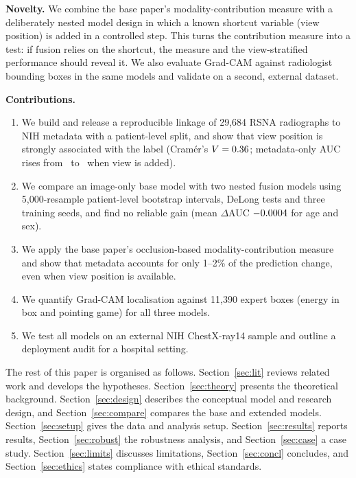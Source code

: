 \documentclass[conference]{IEEEtran}
\begin{document}
\textbf{Novelty.} We combine the base paper's modality-contribution measure with a deliberately nested model design in which a known shortcut variable (view position) is added in a controlled step. This turns the contribution measure into a test: if fusion relies on the shortcut, the measure and the view-stratified performance should reveal it. We also evaluate Grad-CAM against radiologist bounding boxes in the same models and validate on a second, external dataset.

\textbf{Contributions.}
\begin{enumerate}
\item We build and release a reproducible linkage of 29,684 RSNA radiographs to NIH metadata with a patient-level split, and show that view position is strongly associated with the label (Cram\'er's $V=0.36$; metadata-only AUC rises from \aucTabAS\ to \aucTabASV\ when view is added).
\item We compare an image-only base model with two nested fusion models using 5,000-resample patient-level bootstrap intervals, DeLong tests and three training seeds, and find no reliable gain (mean $\Delta$AUC $-0.0004$ for age and sex).
\item We apply the base paper's occlusion-based modality-contribution measure and show that metadata accounts for only 1--2\% of the prediction change, even when view position is available.
\item We quantify Grad-CAM localisation against 11,390 expert boxes (energy in box and pointing game) for all three models.
\item We test all models on an external NIH ChestX-ray14 sample and outline a deployment audit for a hospital setting.
\end{enumerate}

The rest of this paper is organised as follows. Section~\ref{sec:lit} reviews related work and develops the hypotheses. Section~\ref{sec:theory} presents the theoretical background. Section~\ref{sec:design} describes the conceptual model and research design, and Section~\ref{sec:compare} compares the base and extended models. Section~\ref{sec:setup} gives the data and analysis setup. Section~\ref{sec:results} reports results, Section~\ref{sec:robust} the robustness analysis, and Section~\ref{sec:case} a case study. Section~\ref{sec:limits} discusses limitations, Section~\ref{sec:concl} concludes, and Section~\ref{sec:ethics} states compliance with ethical standards.
\end{document}
